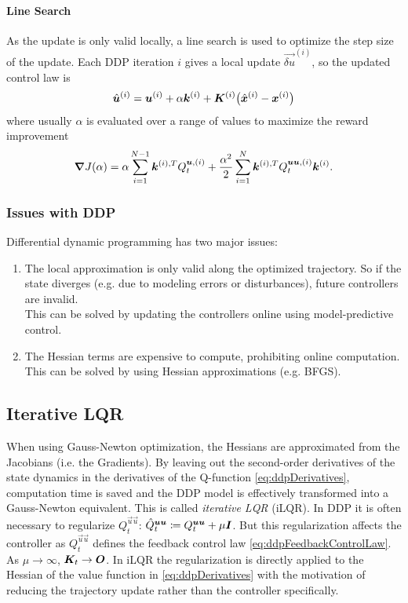				\paragraph{Line Search}
					As the update is only valid locally, a line search is used to optimize the step size of the update. Each DDP iteration \(i\) gives a local update \( \vec{\delta u}^{(i)} \), so the updated control law is
					\begin{equation*}
						\hat{\bm{u}}^{(i)} = \bm{u}^{(i)} + \alpha \bm{k}^{(i)} + \bm{K}^{(i)} \big( \hat{\bm{x}}^{(i)} - \bm{x}^{(i)} \big) \\
					\end{equation*}
					where usually \(\alpha\) is evaluated over a range of values to maximize the reward improvement
					\begin{equation*}
						\grad{J(\alpha)} = \alpha \sum_{i = 1}^{N - 1} \bm{k}^{(i), T} Q_t^{\bm{u}, (i)} + \frac{\alpha^2}{2} \sum_{i = 1}^{N} \bm{k}^{(i), T} Q_t^{\bm{u} \bm{u}, (i)} \bm{k}^{(i)}.
					\end{equation*}

			\subsubsection{Issues with DDP}
				Differential dynamic programming has two major issues:
				\begin{enumerate}
					\item The local approximation is only valid along the optimized trajectory. So if the state diverges (e.g. due to modeling errors or disturbances), future controllers are invalid. \\
						This can be solved by updating the controllers online using model-predictive control.
					\item The Hessian terms are expensive to compute, prohibiting online computation. \\
						This can be solved by using Hessian approximations (e.g. BFGS).
				\end{enumerate}

		\subsection{Iterative LQR}
			When using Gauss-Newton optimization, the Hessians are approximated from the Jacobians (i.e. the Gradients). By leaving out the second-order derivatives of the state dynamics in the derivatives of the Q-function \eqref{eq:ddpDerivatives}, computation time is saved and the DDP model is effectively transformed into a Gauss-Newton equivalent. This is called \emph{iterative LQR} (iLQR). In DDP it is often necessary to regularize \( Q_t^{\vec{u} \vec{u}} \): \( \hat{Q}_t^{\bm{u} \bm{u}} \coloneqq Q_t^{\bm{u} \bm{u}} + \mu \bm{I} \). But this regularization affects the controller as \( Q_t^{\vec{u} \vec{u}} \) defines the feedback control law \eqref{eq:ddpFeedbackControlLaw}. As \( \mu \to \infty \), \( \bm{K}_t \to \bm{O} \). In iLQR the regularization is directly applied to the Hessian of the value function in \eqref{eq:ddpDerivatives} with the motivation of reducing the trajectory update rather than the controller specifically.


